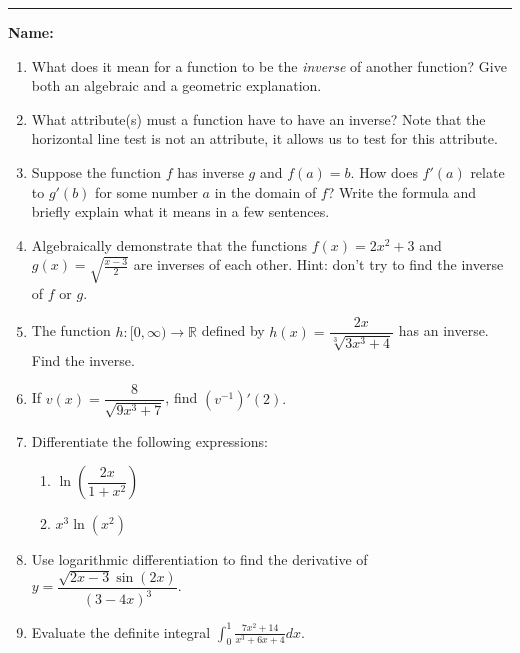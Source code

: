 \documentclass[11pt]{article}
\let\ds\displaystyle
\begin{document}
    \hrule
    \vspace{.5cm}
    \noindent\textbf{Name:} \underline{\qquad\qquad\qquad\qquad\qquad\qquad\qquad\qquad\qquad\qquad\qquad\qquad\qquad}

    \begin{enumerate}
        \item What does it mean for a function to be the \textit{inverse} of another function? Give both an algebraic and a geometric explanation.
        \vfill
        \item What attribute(s) must a function have to have an inverse? Note that the horizontal line test is not an attribute, it allows us to test for this attribute.
        \vfill
        \item Suppose the function $f$ has inverse $g$ and $f(a)=b$. How does $f'(a)$ relate to $g'(b)$ for some number $a$ in the domain of $f$? Write the formula and briefly explain what it means in a few sentences.
        \vfill
        \newpage
        \item Algebraically demonstrate that the functions $f(x)=2x^{2}+3$ and $g(x)=\ds\sqrt{\frac{x-3}{2}}$ are inverses of each other. Hint: don't try to find the inverse of $f$ or $g$.
        \vfill
        \item The function $h:[0,\infty)\to\mathbb{R}$ defined by $h(x)=\dfrac{2x}{\sqrt[3]{3x^{3}+4}}$ has an inverse. Find the inverse.
        \vfill
        \item If $v(x)=\dfrac{8}{\sqrt{9x^{3}+7}}$, find $(v^{-1})'(2).$
        \vfill
        \newpage
        \item Differentiate the following expressions:
        \begin{enumerate}
            \item $\ln\left(\dfrac{2x}{1+x^{2}}\right)$
            \vfill
            \item $x^{3}\ln(x^{2})$
            \vfill
        \end{enumerate}
        \item Use logarithmic differentiation to find the derivative of $y=\dfrac{\sqrt{2x-3}\sin(2x)}{(3-4x)^{3}}$.
        \vfill
        \newpage
        \item Evaluate the definite integral $\displaystyle\int_{0}^{1}\frac{7x^2+14}{x^{3}+6x+4}dx$.
    \end{enumerate}
\end{document}
